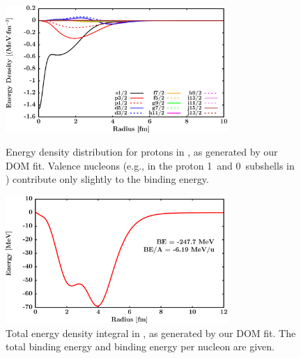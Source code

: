 \begin{figure}[tb]
    \centering
    \includegraphics[width=0.75\textwidth]{figures/ca40_EnergyDist.png}
    \caption[Energy density distribution for protons in \caForty]
    {
        Energy density distribution for protons in \caForty, as generated
        by our DOM fit. Valence nucleons (e.g., in the proton 1\sOne\ and
        0\dThree\ subshells in \caForty) contribute only slightly to the binding
        energy.
    }
    \label{Ca40EnergyDist}
    \vspace{16pt}
    \includegraphics[width=0.75\textwidth]{figures/ca40_EnergyDistIntegral.png}
    \caption[Total energy density integral in \caForty]
    {
        Total energy density integral in \caForty, as generated
        by our DOM fit. The total binding energy and binding energy per
        nucleon are given.
    }
    \label{Ca40EnergyDistIntegral}
\end{figure}

